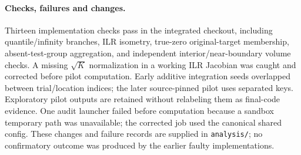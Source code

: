 \paragraph{Checks, failures and changes.}
Thirteen implementation checks pass in the integrated checkout, including quantile/infinity branches, ILR isometry, true-zero original-target membership, absent-test-group aggregation, and independent interior/near-boundary volume checks. A missing $\sqrt K$ normalization in a working ILR Jacobian was caught and corrected before pilot computation. Early additive integration seeds overlapped between trial/location indices; the later source-pinned pilot uses separated keys. Exploratory pilot outputs are retained without relabeling them as final-code evidence. One audit launcher failed before computation because a sandbox temporary path was unavailable; the corrected job used the canonical shared config. These changes and failure records are supplied in \texttt{analysis/}; no confirmatory outcome was produced by the earlier faulty implementations.


